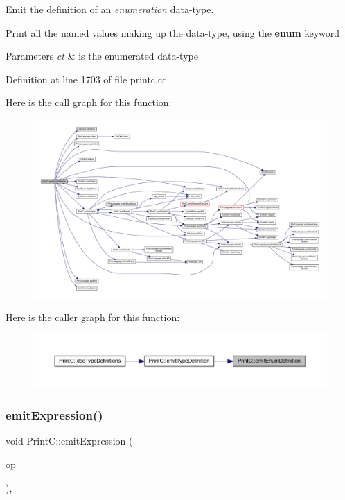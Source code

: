 Emit the definition of an {\itshape enumeration} data-\/type. 

Print all the named values making up the data-\/type, using the {\bfseries{enum}} keyword 
\begin{DoxyParams}{Parameters}
{\em ct} & is the enumerated data-\/type \\
\hline
\end{DoxyParams}


Definition at line 1703 of file printc.\+cc.

Here is the call graph for this function\+:
\nopagebreak
\begin{figure}[H]
\begin{center}
\leavevmode
\includegraphics[width=350pt]{class_print_c_acbe0fabc1fd91b959cfb892fc4149df7_cgraph}
\end{center}
\end{figure}
Here is the caller graph for this function\+:
\nopagebreak
\begin{figure}[H]
\begin{center}
\leavevmode
\includegraphics[width=350pt]{class_print_c_acbe0fabc1fd91b959cfb892fc4149df7_icgraph}
\end{center}
\end{figure}
\mbox{\label{class_print_c_a23d8dc013a41698d5168665451b356f6}} 
\subsubsection{\texorpdfstring{emitExpression()}{emitExpression()}}
{\footnotesize\ttfamily void Print\+C\+::emit\+Expression (\begin{DoxyParamCaption}\item[{const \mbox{\hyperlink{class_pcode_op}{Pcode\+Op}} $\ast$}]{op }\end{DoxyParamCaption})\hspace{0.3cm}{\ttfamily [protected]}, {\ttfamily [virtual]}}



